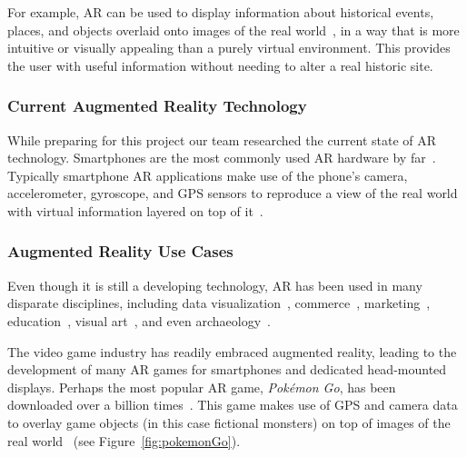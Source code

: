 \documentclass[a4paper, 10pt, american, titlepage]{article}
\begin{document}
For example, AR can be used to display information about historical events,
places, and objects overlaid onto images of the real
world~\autocite{saenz2009}, in a way that is more intuitive or visually
appealing than a purely virtual environment. This provides the user with useful
information without needing to alter a real historic site.

\subsubsection{Current Augmented Reality Technology}
\label{sec:currentAugmentedRealityTechnology}

While preparing for this project our team researched the current state of AR
technology. Smartphones are the most commonly used AR hardware by
far~\autocite{boland2018}. Typically smartphone AR applications make use of the
phone's camera, accelerometer, gyroscope, and GPS sensors to reproduce a view
of the real world with virtual information layered on top of
it~\autocite{bonsor2018}.

\subsubsection{Augmented Reality Use Cases}
\label{sec:augmentedRealityUseCases}

Even though it is still a developing technology, AR has been used in many
disparate disciplines, including data visualization~\autocite{resnick2017},
commerce~\autocite{matney2018}, marketing~\autocite{sharma2015},
education~\autocite{stewart-smith2012}, visual art~\autocite{katz2018}, and
even archaeology~\autocite{eve2012}.

The video game industry has readily embraced augmented reality, leading to the
development of many AR games for smartphones and dedicated head-mounted
displays. Perhaps the most popular AR game, \textit{Pokémon Go}, has been
downloaded over a billion times~\autocite{webster2018}. This game makes use of
GPS and camera data to overlay game objects (in this case fictional monsters) on
top of images of the real world~\autocite{concepcion2016} (see
Figure~\ref{fig:pokemonGo}).
\end{document}
